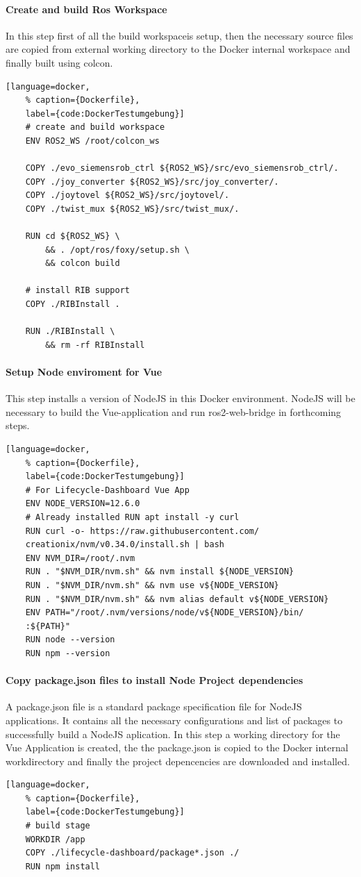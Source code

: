 \paragraph*{Create and build Ros Workspace} In this step first of all the build workspaceis setup, then the necessary source files are copied from external working directory to the Docker internal workspace and finally built using colcon.
\begin{lstlisting}[language=docker,
	% caption={Dockerfile}, 
	label={code:DockerTestumgebung}]
	# create and build workspace
	ENV ROS2_WS /root/colcon_ws
		
	COPY ./evo_siemensrob_ctrl ${ROS2_WS}/src/evo_siemensrob_ctrl/.
	COPY ./joy_converter ${ROS2_WS}/src/joy_converter/.
	COPY ./joytovel ${ROS2_WS}/src/joytovel/.
	COPY ./twist_mux ${ROS2_WS}/src/twist_mux/.

	RUN cd ${ROS2_WS} \
		&& . /opt/ros/foxy/setup.sh \
		&& colcon build
		
	# install RIB support
	COPY ./RIBInstall .

	RUN ./RIBInstall \
		&& rm -rf RIBInstall
\end{lstlisting}

\paragraph{Setup Node enviroment for Vue} This step installs a version of NodeJS in this Docker environment. NodeJS will be necessary to build the Vue-application and run ros2-web-bridge in forthcoming steps. 
\begin{lstlisting}[language=docker,
	% caption={Dockerfile}, 
	label={code:DockerTestumgebung}]
	# For Lifecycle-Dashboard Vue App
	ENV NODE_VERSION=12.6.0
	# Already installed RUN apt install -y curl
	RUN curl -o- https://raw.githubusercontent.com/
	creationix/nvm/v0.34.0/install.sh | bash
	ENV NVM_DIR=/root/.nvm
	RUN . "$NVM_DIR/nvm.sh" && nvm install ${NODE_VERSION}
	RUN . "$NVM_DIR/nvm.sh" && nvm use v${NODE_VERSION}
	RUN . "$NVM_DIR/nvm.sh" && nvm alias default v${NODE_VERSION}
	ENV PATH="/root/.nvm/versions/node/v${NODE_VERSION}/bin/
	:${PATH}"
	RUN node --version
	RUN npm --version
\end{lstlisting}



\paragraph{Copy package.json files to install Node Project dependencies} A package.json file is a standard package specification file for NodeJS applications. It contains all the necessary configurations and list of packages to successfully build a NodeJS aplication. In this step 
a working directory for the Vue Application is created, the the package.json is copied to the Docker internal workdirectory and finally the project depencencies are downloaded and installed.
\begin{lstlisting}[language=docker,
	% caption={Dockerfile}, 
	label={code:DockerTestumgebung}]
	# build stage
	WORKDIR /app
	COPY ./lifecycle-dashboard/package*.json ./
	RUN npm install
\end{lstlisting}

